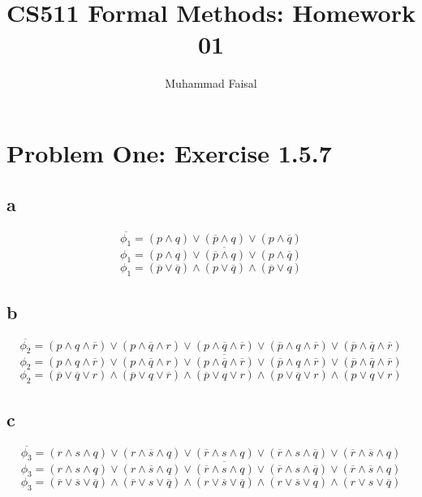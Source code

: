 \documentclass[11pt,leqno,fleqn]{article}
\title{CS511 Formal Methods: Homework 01}
\author{Muhammad Faisal}
\date{} %
\begin{document}
\maketitle


\section{Problem One: Exercise 1.5.7}
\subsection{a}
$$\overline{\phi_1} = (p \land q) \lor ( \overline{p} \land q) \lor (p \land \overline{q})$$
$$\phi_1 = \overline{(p \land q) \lor ( \overline{p} \land q) \lor (p \land \overline{q})}$$
$$\phi_1 = (\overline{p} \lor \overline{q}) \land ( p \lor \overline{q}) \land (\overline{p} \lor q)$$

\subsection{b}
$$\overline{\phi_2} = ( p \land q \land \overline{r} ) \lor ( p \land \overline{q} \land r ) \lor ( p \land \overline{q} \land \overline{r} ) \lor ( \overline{p} \land q \land \overline{r} ) \lor ( \overline{p} \land \overline{q} \land \overline{r})$$
$$\phi_2 = \overline{( p \land q \land \overline{r} ) \lor ( p \land \overline{q} \land r ) \lor ( p \land \overline{q} \land \overline{r} ) \lor ( \overline{p} \land q \land \overline{r} ) \lor ( \overline{p} \land \overline{q} \land \overline{r})}$$
$$\phi_2 = ( \overline{p} \lor \overline{q} \lor r ) \land ( \overline{p} \lor q \lor \overline{r} ) \land ( \overline{p} \lor q \lor r ) \land ( p \lor \overline{q} \lor r ) \land ( p \lor q \lor r)$$

\subsection{c}
$$\overline{\phi_3} = ( r \land s \land q ) \lor ( r \land \overline{s} \land q) \lor ( \overline{r} \land s \land q) \lor ( \overline{r} \land s \land \overline{q}) \lor ( \overline{r} \land \overline{s} \land q)$$
$$\phi_3 = \overline{( r \land s \land q ) \lor ( r \land \overline{s} \land q) \lor ( \overline{r} \land s \land q) \lor ( \overline{r} \land s \land \overline{q}) \lor ( \overline{r} \land \overline{s} \land q)}$$
$$\phi_3 = ( \overline{r} \lor \overline{s} \lor \overline{q} ) \land ( \overline{r} \lor s \lor \overline{q} ) \land ( r \lor \overline{s} \lor \overline{q} ) \land ( r \lor \overline{s} \lor q ) \land ( r \lor s \lor \overline{q} )$$
\end{document}
